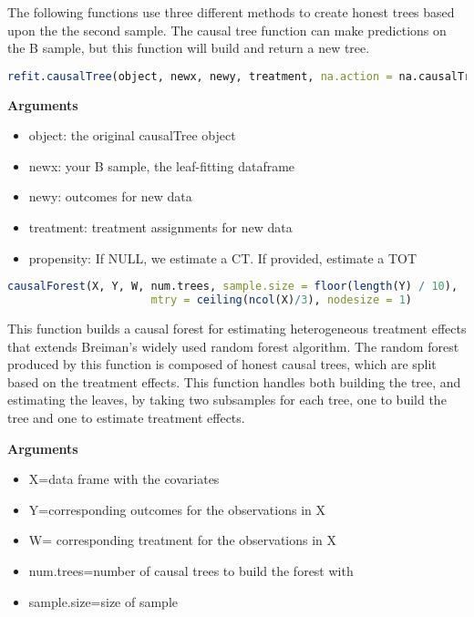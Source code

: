 \documentclass{article}
\begin{document}
The following  functions use three different methods to create honest trees based upon the the second sample. The causal tree function can make predictions on the B sample, but this function will build and return a new tree. 
\begin{lstlisting}[language=R]
refit.causalTree(object, newx, newy, treatment, na.action = na.causalTree, propensity = NULL)
\end{lstlisting}
\textbf{Arguments} \\
\begin{itemize}
  \item object: the original causalTree object
  \item newx: your B sample, the leaf-fitting dataframe
  \item newy: outcomes for new data
  \item treatment: treatment assignments for new data
  \item propensity: If NULL, we estimate a CT. If provided, estimate a TOT
 \end{itemize}



 \begin{lstlisting}[language=R]
causalForest(X, Y, W, num.trees, sample.size = floor(length(Y) / 10), 
                      mtry = ceiling(ncol(X)/3), nodesize = 1)
\end{lstlisting}
This function builds a causal forest for estimating heterogeneous treatment effects that extends Breiman's widely used random forest algorithm. The random forest produced by this function is composed of honest causal trees, which are split based on the treatment effects. This function handles both building the tree, and estimating the leaves, by taking two subsamples for each tree, one to build the tree and one to estimate treatment effects.

\textbf{Arguments} \\
\begin{itemize}
  \item X=data frame with the covariates
  \item Y=corresponding outcomes for the observations in X
  \item W= corresponding treatment for the observations in X  
  \item num.trees=number of causal trees to build the forest with 
  \item sample.size=size of sample 
\end{itemize}
\end{document}

